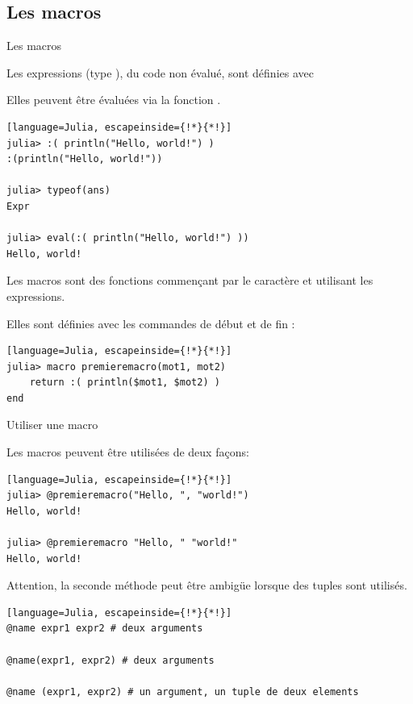 \subsection{Les macros}
\begin{frame}[containsverbatim]{Les macros}
\par{Les expressions (type ), du code non évalué, sont définies avec\\\quad {}}
\par{Elles peuvent être évaluées via la fonction .}
\begin{lstlisting}[language=Julia, escapeinside={!*}{*!}]
julia> :( println("Hello, world!") )
:(println("Hello, world!"))

julia> typeof(ans)
Expr

julia> eval(:( println("Hello, world!") ))
Hello, world!
\end{lstlisting}
\vspace{2ex}
\par{Les macros sont des fonctions commençant par le caractère  et utilisant les expressions.}
\par{Elles sont définies avec les commandes de début  et de fin :}
\begin{lstlisting}[language=Julia, escapeinside={!*}{*!}]
julia> macro premieremacro(mot1, mot2)
    return :( println($mot1, $mot2) )
end
\end{lstlisting}
\end{frame}


\begin{frame}[containsverbatim]{Utiliser une macro}
\par{Les macros peuvent être utilisées de deux façons:}
\begin{lstlisting}[language=Julia, escapeinside={!*}{*!}]
julia> @premieremacro("Hello, ", "world!")
Hello, world!

julia> @premieremacro "Hello, " "world!"
Hello, world!
\end{lstlisting}
\vspace{2ex}
\par{\textcolor{firebrick2}{Attention, la seconde méthode peut être ambigüe lorsque des tuples sont utilisés.}}
\begin{lstlisting}[language=Julia, escapeinside={!*}{*!}]
@name expr1 expr2 # deux arguments

@name(expr1, expr2) # deux arguments

@name (expr1, expr2) # un argument, un tuple de deux elements
\end{lstlisting}
\end{frame}


